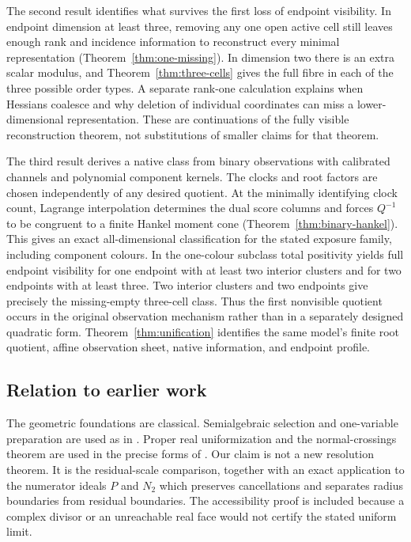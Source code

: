 \documentclass[11pt,reqno]{amsart}
\numberwithin{equation}{section}
\theoremstyle{definition}
\theoremstyle{remark}
\begin{document}
The second result identifies what survives the first loss of endpoint
visibility. In endpoint dimension at least three, removing any one open
active cell still leaves enough rank and incidence information to
reconstruct every minimal representation
(Theorem~\ref{thm:one-missing}). In dimension two there is an extra scalar
modulus, and Theorem~\ref{thm:three-cells} gives the full fibre in each
of the three possible order types. A separate rank-one calculation
explains when Hessians coalesce and why deletion of individual coordinates
can miss a lower-dimensional representation. These are continuations of
the fully visible reconstruction theorem, not substitutions of smaller
claims for that theorem.

The third result derives a native class from binary observations with
calibrated channels and polynomial component kernels. The clocks and root
factors are chosen independently of any desired quotient. At the minimally
identifying clock count, Lagrange interpolation determines the dual score
columns and forces $Q^{-1}$ to be congruent to a finite Hankel moment cone
(Theorem~\ref{thm:binary-hankel}). This gives an exact all-dimensional
classification for the stated exposure family, including component
colours. In the one-colour subclass total positivity yields full endpoint
visibility for one endpoint with at least two interior clusters and for
two endpoints with at least three. Two interior clusters and two endpoints
give precisely the missing-empty three-cell class. Thus the first
nonvisible quotient occurs in the original observation mechanism rather
than in a separately designed quadratic form. Theorem~\ref{thm:unification}
identifies the same model's finite root quotient, affine observation sheet,
native information, and endpoint profile.

\subsection*{Relation to earlier work}
The geometric foundations are classical. Semialgebraic selection and
one-variable preparation are used as in \cite{BCR}. Proper real
uniformization and the normal-crossings theorem are used in the precise
forms of \cite[Theorem 0.1 and Corollary 4.9]{BM}. Our claim is not a new
resolution theorem. It is the residual-scale comparison, together with
an exact application to the numerator ideals $P$ and $N_2$ which preserves
cancellations and separates radius boundaries from residual boundaries.
The accessibility proof is included because a complex divisor or an
unreachable real face would not certify the stated uniform limit.
\end{document}
